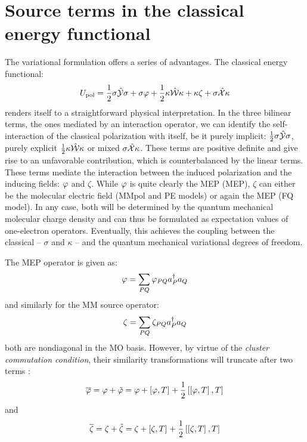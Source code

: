 \section{Source terms in the classical energy functional}

The variational formulation offers a series of advantages.
The classical energy functional:
\begin{equation}
  U_\mathrm{pol} =
   \frac{1}{2}\sigma\hat{\mathcal{Y}}\sigma + \sigma\varphi
 + \frac{1}{2}\kappa\hat{\mathcal{W}}\kappa + \kappa\zeta
 + \sigma\hat{\mathcal{X}}\kappa
\end{equation}
renders itself to a straightforward physical interpretation. In the
three bilinear terms, \ie{} the ones mediated by an interaction
operator, we can identify the self-interaction of the classical
polarization with itself, be it purely implicit:
$\frac{1}{2}\sigma\hat{\mathcal{Y}}\sigma$, purely explicit
$\frac{1}{2}\kappa\hat{\mathcal{W}}\kappa$ or mixed $\sigma\hat{\mathcal{X}}\kappa$.
These terms are positive definite and give rise to an unfavorable
contribution, which is counterbalanced by the linear terms. These terms
mediate the interaction between the induced polarization and the
inducing fields: $\varphi$ and $\zeta$. While $\varphi$ is quite clearly the
\acl{MEP} (\acs{MEP}), $\zeta$ can either be the molecular electric
field (MMpol and PE models) or again the \acs{MEP} (FQ model).
In any case, both will be determined by the quantum mechanical molecular
charge density and can thus be formulated as expectation values of
one-electron operators. Eventually, this achieves the coupling between
the classical -- $\sigma$ and $\kappa$ -- and
the quantum mechanical variational degrees of freedom.

The \acs{MEP} operator is given as:
\begin{equation}
  \varphi = \sum_{PQ}\varphi_{PQ}a_{P}^{\dagger}a_{Q}
\end{equation}
and similarly for the \acs{MM} source operator:
\begin{equation}
  \zeta = \sum_{PQ}\zeta_{PQ}a_{P}^{\dagger}a_{Q}
\end{equation}
both are nondiagonal in the MO basis. However,
by virtue of the \emph{cluster commutation condition}, their similarity
transformations will truncate after two
terms \cite{Helgaker2000-tz}:
\begin{equation}
  \overline{\varphi} = \varphi + \tilde{\varphi}  = \varphi + \left[ \varphi, T \right]^{} +
  \frac{1}{2}\left[ \left[ \varphi, T \right]^{}, T \right]^{}
\end{equation}
and
\begin{equation}
  \overline{\zeta} = \zeta + \tilde{\zeta}  = \zeta + \left[ \zeta, T \right]^{} +
  \frac{1}{2}\left[ \left[ \zeta, T \right]^{}, T \right]^{}
\end{equation}

